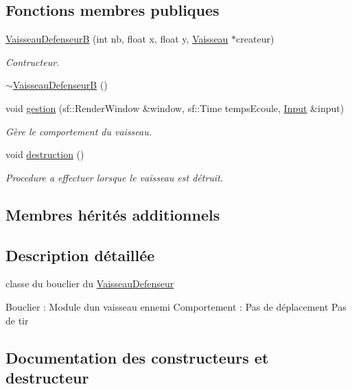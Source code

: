 \subsection*{Fonctions membres publiques}
\begin{DoxyCompactItemize}
\item 
\hyperlink{class_vaisseau_defenseur_b_a7f6ddaa53d153a14a760bc51945ebb30}{Vaisseau\+DefenseurB} (int nb, float x, float y, \hyperlink{class_vaisseau}{Vaisseau} $\ast$createur)
\begin{DoxyCompactList}\small\item\em Contructeur. \end{DoxyCompactList}\item 
\hyperlink{class_vaisseau_defenseur_b_acb6347ed84b0364d36bf581d7a3e1129}{$\sim$\+Vaisseau\+DefenseurB} ()
\item 
void \hyperlink{class_vaisseau_defenseur_b_aae8e2488b91dbd1ceef8969debbc234f}{gestion} (sf\+::\+Render\+Window \&window, sf\+::\+Time temps\+Ecoule, \hyperlink{_input_8h_a5588d60d674991c719a8df848313e966}{Input} \&input)
\begin{DoxyCompactList}\small\item\em Gère le comportement du vaisseau. \end{DoxyCompactList}\item 
void \hyperlink{class_vaisseau_defenseur_b_aba88319dcc7540dce39c164fa9853732}{destruction} ()
\begin{DoxyCompactList}\small\item\em Procedure a effectuer lorsque le vaisseau est détruit. \end{DoxyCompactList}\end{DoxyCompactItemize}
\subsection*{Membres hérités additionnels}


\subsection{Description détaillée}
classe du bouclier du \hyperlink{class_vaisseau_defenseur}{Vaisseau\+Defenseur} 

Bouclier \+: Module d\textquotesingle{}un vaisseau ennemi Comportement \+: Pas de déplacement Pas de tir 

\subsection{Documentation des constructeurs et destructeur}
\mbox{\label{class_vaisseau_defenseur_b_a7f6ddaa53d153a14a760bc51945ebb30}} 
